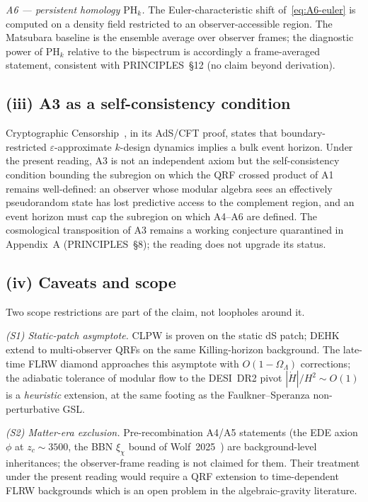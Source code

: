 \documentclass[epjc3,twocolumn]{svjour3}
\begin{document}
\emph{A6 --- persistent homology $\mathrm{PH}_k$.} The Euler-characteristic
shift of~\eqref{eq:A6-euler} is computed on a density field restricted to
an observer-accessible region. The Matsubara baseline is the ensemble
average over observer frames; the diagnostic power of $\mathrm{PH}_k$
relative to the bispectrum is accordingly a frame-averaged statement,
consistent with PRINCIPLES~\S12 (no claim beyond derivation).

\subsection*{(iii) A3 as a self-consistency condition}

Cryptographic Censorship~\cite{CryptoCensorship}, in its AdS/CFT proof,
states that boundary-restricted $\varepsilon$-approximate $k$-design
dynamics implies a bulk event horizon. Under the present reading, A3 is
not an independent axiom but the self-consistency condition bounding the
subregion on which the QRF crossed product of A1 remains well-defined:
an observer whose modular algebra sees an effectively pseudorandom state
has lost predictive access to the complement region, and an event horizon
must cap the subregion on which A4--A6 are defined. The cosmological
transposition of A3 remains a working conjecture quarantined in
Appendix~A (PRINCIPLES~\S8); the reading does not upgrade its status.

\subsection*{(iv) Caveats and scope}

Two scope restrictions are part of the claim, not loopholes around it.

\emph{(S1) Static-patch asymptote.} CLPW is proven on the static dS
patch; DEHK extend to multi-observer QRFs on the same Killing-horizon
background. The late-time FLRW diamond approaches this asymptote with
$O(1-\Omega_\Lambda)$ corrections; the adiabatic tolerance of modular
flow to the DESI~DR2 pivot $|\dot H|/H^2 \sim O(1)$ is a \emph{heuristic}
extension, at the same footing as the Faulkner--Speranza
non-perturbative GSL.

\emph{(S2) Matter-era exclusion.} Pre-recombination A4/A5 statements
(the EDE axion $\phi$ at $z_c\sim 3500$, the BBN $\xi_\chi$ bound of
Wolf~2025~\cite{Wolf2025}) are background-level inheritances; the
observer-frame reading is not claimed for them. Their treatment under
the present reading would require a QRF extension to time-dependent FLRW
backgrounds which is an open problem in the algebraic-gravity
literature.
\end{document}
